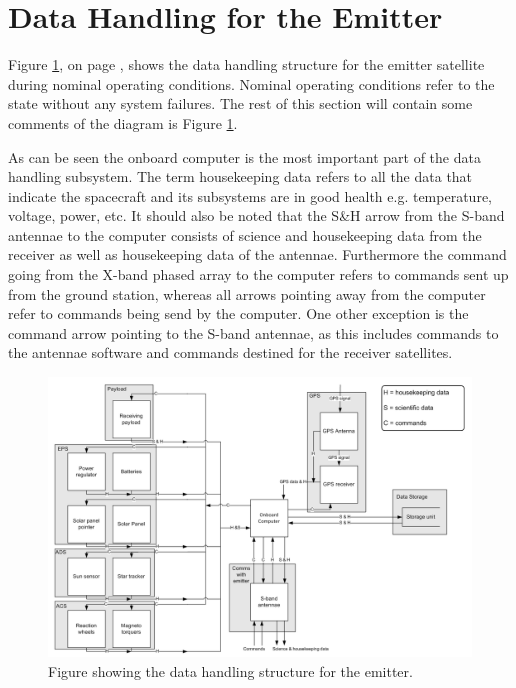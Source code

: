 \section{Data Handling for the Emitter}
\label{DataHandlingEmitter}

Figure \ref{fig:DHE}, on page \pageref{fig:DHE}, shows the data handling structure for the emitter satellite during nominal operating conditions. Nominal operating conditions refer to the state without any system failures. The rest of this section will contain some comments of the diagram is Figure \ref{fig:DHE}.

As can be seen the onboard computer is the most important part of the data handling subsystem. The term housekeeping data refers to all the data that indicate the spacecraft and its subsystems are in good health e.g. temperature, voltage, power, etc. It should also be noted that the S\&H arrow from the S-band antennae to the computer consists of science and housekeeping data from the receiver as well as  housekeeping data of the antennae. Furthermore the command going from the X-band phased array to the computer refers to commands sent up from the ground station, whereas all arrows pointing away from the computer refer to commands being send by the computer. One other exception is the command arrow pointing to the S-band antennae, as this includes commands to the antennae software and commands destined for the receiver satellites.

\begin{figure}
\centering
\includegraphics[width=1.0\textwidth, angle=90]{img/DHReceiver.png}
\caption{Figure showing the data handling structure for the emitter.}
\label{fig:DHE}
\end{figure}
